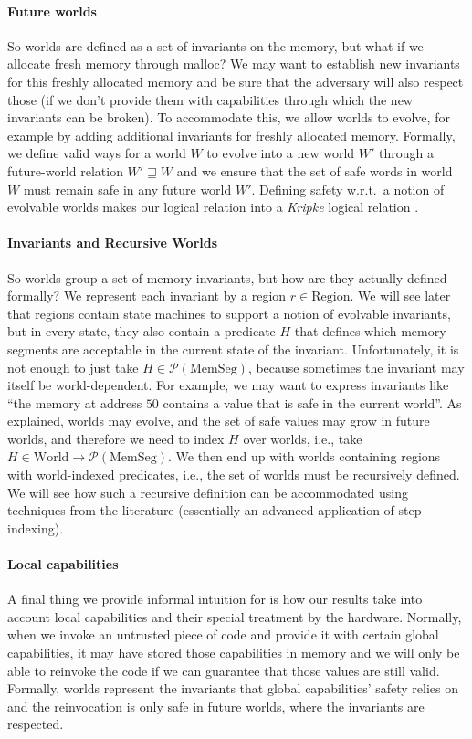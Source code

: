 \documentclass{llncs}
\newcommand{\powerset}[1]{\mathcal{P}(#1)}
\newcommand{\future}{\mathbin{\sqsupseteq}}
\newcommand{\plaindom}[1]{\mathrm{#1}}
\newcommand{\HeapSegments}{\plaindom{MemSeg}}
\newcommand{\MemSegments}{\HeapSegments}
\newcommand{\Regions}{\plaindom{Region}}
\newcommand{\Worlds}{\plaindom{World}}
\begin{document}
\paragraph{Future worlds}
So worlds are defined as a set of invariants on the memory, but what if we
allocate fresh memory through malloc? We may want to establish new invariants
for this freshly allocated memory and be sure that the adversary will also
respect those (if we don't provide them with capabilities through which the new
invariants can be broken). To accommodate this, we allow worlds to evolve, for
example by adding additional invariants for freshly allocated memory. Formally,
we define valid ways for a world $W$ to evolve into a new world $W'$ through a
future-world relation $W' \future W$ and we ensure that the set of safe words in
world $W$ must remain safe in any future world $W'$. Defining safety w.r.t.\ a
notion of evolvable worlds makes our logical relation into a \emph{Kripke}
logical relation \cite{pitts_operational_1998}.

\paragraph{Invariants and Recursive Worlds}
So worlds group a set of memory invariants, but how are they actually
defined formally? We represent each invariant by a region
$r \in \Regions$. We will see later that regions contain state
machines to support a notion of evolvable invariants, but in every
state, they also contain a predicate $H$ that defines which memory
segments are acceptable in the current state of the invariant.
Unfortunately, it is not enough to just take
$H \in \powerset{\MemSegments}$, because sometimes the invariant may
itself be world-dependent. For example, we may want to express
invariants like ``the memory at address $50$ contains a value that is
safe in the current world''. As explained, worlds may evolve, and the
set of safe values may grow in future worlds, and therefore we need to
index $H$ over worlds, i.e., take
$H \in \Worlds \rightarrow \powerset{\MemSegments}$. We then end up
with worlds containing regions with world-indexed predicates,
i.e., the set of worlds must be recursively defined. We will see how such a recursive
definition can be accommodated using techniques from the
literature (essentially an advanced application of step-indexing).

\paragraph{Local capabilities}
A final thing we provide informal intuition for is how our results take into account local
capabilities and their special treatment by the hardware. Normally, when we
invoke an untrusted piece of code and provide it with certain global
capabilities, it may have stored those capabilities in memory and we will only
be able to reinvoke the code if we can guarantee that those values are still
valid. Formally, worlds represent the invariants that global capabilities'
safety relies on and the reinvocation is only safe in future worlds, where the
invariants are respected.
\end{document}
